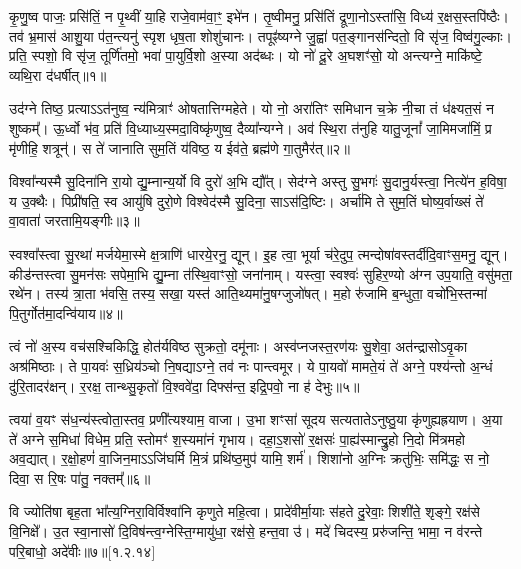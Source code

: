 कृ॒णु॒ष्व पाजः॒ प्रसि॑तिं॒ न पृ॒थ्वीं या॒हि राजे॒वाम॑वा॒ꣳ॒ इभे॑न। तृ॒ष्वीमनु॒ प्रसि॑तिं द्रूणा॒नोऽस्ता॑सि॒ विध्य॑ र॒क्षस॒स्तपि॑ष्ठैः। तव॑ भ्र॒मास॑ आशु॒या प॑त॒न्त्यनु॑ स्पृश धृष॒ता शोशु॑चानः। तपूꣴ॑ष्यग्ने जु॒ह्वा॑ पत॒ङ्गानस॑न्दितो॒ वि सृ॑ज॒ विष्व॑गु॒ल्काः। प्रति॒ स्पशो॒ वि सृ॑ज॒ तूर्णि॑तमो॒ भवा॑ पा॒युर्वि॒शो अ॒स्या अद॑ब्धः। यो नो॑ दू॒रे अ॒घशꣳ॑सो॒  यो अन्त्यग्ने॒ माकि॑ष्टे॒ व्यथि॒रा द॑धर्षीत्॥१॥

उद॑ग्ने तिष्ठ॒ प्रत्याऽऽत॑नुष्व॒ न्य॑मित्राꣳ॑ ओषतात्तिग्महेते। यो नो॒ अरा॑तिꣳ समिधान च॒क्रे नी॒चा तं ध॑क्ष्यत॒सं न शुष्कम्᳚। ऊ॒र्ध्वो भ॑व॒ प्रति॑ वि॒ध्याध्य॒स्मदा॒विष्कृ॑णुष्व॒ दैव्या᳚न्यग्ने। अव॑ स्थि॒रा त॑नुहि यातु॒जूनां᳚ जा॒मिमजा॑मिं॒ प्र मृ॑णीहि॒ शत्रून्॑। स ते॑ जानाति सुम॒तिं य॑विष्ठ॒ य ईव॑ते॒ ब्रह्म॑णे गा॒तुमैर॑त्॥२॥

 विश्वा᳚न्यस्मै सु॒दिना॑नि रा॒यो द्यु॒म्नान्य॒र्यो वि दुरो॑ अ॒भि द्यौ᳚त्। सेद॑ग्ने अस्तु सु॒भगः॑ सु॒दानु॒र्यस्त्वा॒ नित्ये॑न ह॒विषा॒ य उ॒क्थैः। पिप्री॑षति॒ स्व आयु॑षि दुरो॒णे विश्वेद॑स्मै सु॒दिना॒ साऽस॑दि॒ष्टिः। अर्चा॑मि ते सुम॒तिं घोष्य॒र्वाख्सं ते॑ वा॒वाता॑ जरतामि॒यङ्गीः॥३॥
 
स्वश्वा᳚स्त्वा सु॒रथा॑ मर्जयेमा॒स्मे क्ष॒त्राणि॑ धारये॒रनु॒ द्यून्। इ॒ह त्वा॒ भूर्या च॑रे॒दुप॒ त्मन्दोषा॑\-वस्तर्दीदि॒वाꣳ\-स॒मनु॒ द्यून्। कीड॑न्तस्त्वा सु॒मन॑सः सपेमा॒भि द्यु॒म्ना त॑स्थि॒वाꣳसो॒ जना॑नाम्। यस्त्वा॒ स्वश्वः॑ सुहिर॒ण्यो अ॑ग्न उप॒याति॒ वसु॑मता॒ रथे॑न। तस्य॑ त्रा॒ता भ॑वसि॒ तस्य॒ सखा॒ यस्त॑ आति॒थ्यमा॑नु॒षग्जुजो॑षत्। म॒हो रु॑जामि ब॒न्धुता॒ वचो॑भि॒स्तन्मा॑ पि॒तुर्गोत॑मा॒दन्वि॑याय॥४॥

 त्वं नो॑ अ॒स्य वच॑सश्चिकिद्धि॒ होत॑र्यविष्ठ सुक्रतो॒ दमू॑नाः। अस्व॑प्नजस्त॒रण॑यः सु॒शेवा॒ अत॑न्द्रासोऽवृ॒का अश्र॑मिष्ठाः। ते पा॒यवः॑ स॒ध्रिय॑ञ्चो नि॒षद्याऽग्ने॒ तव॑ नः पान्त्वमूर। ये पा॒यवो॑ मामते॒यं ते॑ अग्ने॒ पश्य॑न्तो अ॒न्धं दु॑रि॒तादर॑क्षन्। र॒रक्ष॒ तान्थ्सु॒कृतो॑ वि॒श्ववे॑दा॒ दिफ्स॑न्त॒ इद्रि॒पवो॒ ना ह॑ देभुः॥५॥
 
त्वया॑ व॒यꣳ स॑ध॒न्य॑स्त्वोता॒स्तव॒ प्रणी᳚त्यश्याम॒ वाजा\sn{}। उ॒भा शꣳसा॑ सूदय सत्यतातेऽनुष्ठु॒या कृ॑णुह्यह्रयाण। अ॒या ते॑ अग्ने स॒मिधा॑ विधेम॒ प्रति॒ स्तोमꣳ॑ श॒स्यमा॑नं गृभाय। दहा॒ऽ॒शसो॑ र॒क्षसः॑ पा॒ह्य॑स्मान्द्रु॒हो नि॒दो मि॑त्रमहो अव॒द्यात्। र॒क्षो॒हणं॑ वा॒जिन॒माऽऽजि॑घर्मि मि॒त्रं प्रथि॑ष्ठ॒मुप॑ यामि॒ शर्म॑। शिशा॑नो अ॒ग्निः क्रतु॑भिः॒ समि॑द्धः॒ स नो॒ दिवा॒ स रि॒षः पा॑तु॒ नक्तम्᳚॥६॥

 वि ज्योति॑षा बृह॒ता भा᳚त्य॒ग्निरा॒विर्विश्वा॑नि कृणुते महि॒त्वा। प्रादे॑वीर्मा॒याः स॑हते दु॒रेवाः॒ शिशी॑ते॒ शृङ्गे॒ रक्ष॑से वि॒निक्षे᳚। उ॒त स्वा॒नासो॑ दि॒विष॑न्त्व॒ग्नेस्ति॒ग्मायु॑धा॒ रक्ष॑से॒ हन्त॒वा उ॑। मदे॑ चिदस्य॒ प्ररु॑जन्ति॒ भामा॒ न व॑रन्ते परि॒बाधो॒ अदे॑वीः॥७॥[१.२.१४]

